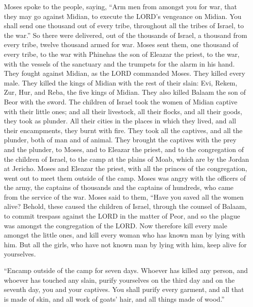  Moses spoke to the people, saying, ``Arm men from amongst
you for war, that they may go against Midian, to execute the LORD's
vengeance on Midian.  You shall send one thousand out of
every tribe, throughout all the tribes of Israel, to the war.''
 So there were delivered, out of the thousands of Israel, a
thousand from every tribe, twelve thousand armed for war. 
Moses sent them, one thousand of every tribe, to the war with Phinehas
the son of Eleazar the priest, to the war, with the vessels of the
sanctuary and the trumpets for the alarm in his hand.  They
fought against Midian, as the LORD commanded Moses. They killed every
male.  They killed the kings of Midian with the rest of
their slain: Evi, Rekem, Zur, Hur, and Reba, the five kings of Midian.
They also killed Balaam the son of Beor with the sword.  The
children of Israel took the women of Midian captive with their little
ones; and all their livestock, all their flocks, and all their goods,
they took as plunder.  All their cities in the places in
which they lived, and all their encampments, they burnt with fire.
 They took all the captives, and all the plunder, both of
man and of animal.  They brought the captives with the prey
and the plunder, to Moses, and to Eleazar the priest, and to the
congregation of the children of Israel, to the camp at the plains of
Moab, which are by the Jordan at Jericho.  Moses and
Eleazar the priest, with all the princes of the congregation, went out
to meet them outside of the camp.  Moses was angry with the
officers of the army, the captains of thousands and the captains of
hundreds, who came from the service of the war.  Moses said
to them, ``Have you saved all the women alive?  Behold,
these caused the children of Israel, through the counsel of Balaam, to
commit trespass against the LORD in the matter of Peor, and so the
plague was amongst the congregation of the LORD.  Now
therefore kill every male amongst the little ones, and kill every woman
who has known man by lying with him.  But all the girls,
who have not known man by lying with him, keep alive for yourselves.

 ``Encamp outside of the camp for seven days. Whoever has
killed any person, and whoever has touched any slain, purify yourselves
on the third day and on the seventh day, you and your captives.
 You shall purify every garment, and all that is made of
skin, and all work of goats' hair, and all things made of wood.''


